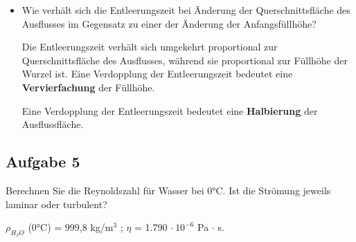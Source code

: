 \documentclass[a4paper,11pt]{article}
\begin{document}
\begin{marginfigure}[+2cm]
\begin{itemize}
Füllstand $h$:
\begin{align*}
h = \frac{V}{\pi \cdot r^2} = \frac{0,2~\text{m}^3}{\pi \cdot (0,25~\text{m})^2} = 1,0186~\text{m}
\end{align*}

\begin{align*}
t &= \sqrt{\frac{2}{g}} \cdot \frac{A_1}{A_2} \cdot \left(\sqrt{h_{\alpha}} - \sqrt{h_w} \right) \\
 &= \sqrt{\frac{2}{9,81~\text{m/s}^2}} \cdot \frac{1.963,5~\text{cm}^2}{0,03~\text{cm}^2} \cdot \left(\sqrt{1,0186~\text{m}} - 0 \right) \\
 &= 29.825,79~\text{s} \qquad \approx 8,28~\text{h}
\end{align*}
Das Fass mit dem kleinen Leck ist nach 8 Stunden noch nicht komplett entleert.
\begin{align*}
t &= \sqrt{\frac{2}{9,81~\text{m/s}^2}} \cdot \frac{1.963,5~\text{cm}^2}{0,05~\text{cm}^2} \cdot \left(\sqrt{1,0186~\text{m}} - 0 \right) \\
 &= 17.895,48~\text{s} \qquad \approx 4,97~\text{h}
\end{align*}
Das Fass mit dem größeren Leck ist bereits nach guten 5 Stunden komplett entleert.

  
\item Wie verhält sich die Entleerungszeit bei Änderung der Querschnittsfläche des Ausflusses im Gegensatz zu einer der Änderung der Anfangsfüllhöhe?


 
Die Entleerungszeit verhält sich umgekehrt proportional zur Querschnittsfläche des Ausflusses, während sie proportional zur Füllhöhe der Wurzel ist. \pp 
Eine Verdopplung der Entleerungszeit bedeutet eine \textbf{Vervierfachung} der Füllhöhe. \par 
Eine Verdopplung der Entleerungszeit bedeutet eine \textbf{Halbierung} der Ausflussfläche. 


\pagebreak
 
  

\end{itemize}






\subsection*{Aufgabe 5}
Berechnen Sie die Reynoldszahl für Wasser bei 0°C. Ist die Strömung jeweils laminar oder turbulent?

$\rho_{H_2O}$ (0°C) = 999,8 kg/m$^3$ ; $\eta$ = 1.790 $\cdot ~ 10^{-6}$ Pa $\cdot$ s. 


\end{marginfigure}
\end{document}
